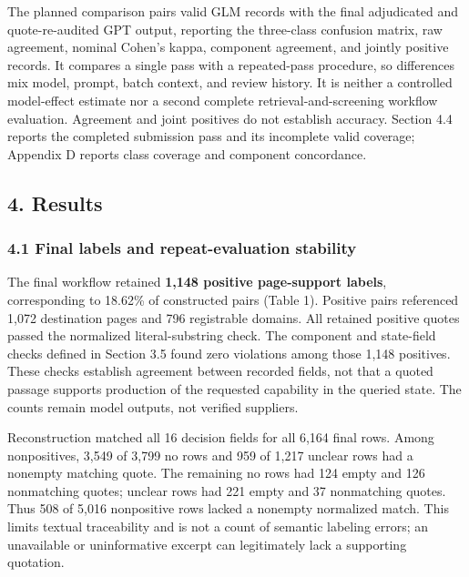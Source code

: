 \documentclass[10pt]{article}
\begin{document}
The planned comparison pairs valid GLM records with the final adjudicated and quote-re-audited GPT output, reporting the three-class confusion matrix, raw agreement, nominal Cohen's kappa, component agreement, and jointly positive records. It compares a single pass with a repeated-pass procedure, so differences mix model, prompt, batch context, and review history. It is neither a controlled model-effect estimate nor a second complete retrieval-and-screening workflow evaluation. Agreement and joint positives do not establish accuracy. Section 4.4 reports the completed submission pass and its incomplete valid coverage; Appendix D reports class coverage and component concordance.

\hypertarget{results}{%
\subsection{4. Results}\label{results}}

\hypertarget{final-labels-and-repeat-evaluation-stability}{%
\subsubsection{4.1 Final labels and repeat-evaluation stability}\label{final-labels-and-repeat-evaluation-stability}}

The final workflow retained \textbf{1,148 positive page-support labels}, corresponding to 18.62\% of constructed pairs (Table 1). Positive pairs referenced 1,072 destination pages and 796 registrable domains. All retained positive quotes passed the normalized literal-substring check. The component and state-field checks defined in Section 3.5 found zero violations among those 1,148 positives. These checks establish agreement between recorded fields, not that a quoted passage supports production of the requested capability in the queried state. The counts remain model outputs, not verified suppliers.

Reconstruction matched all 16 decision fields for all 6,164 final rows. Among nonpositives, 3,549 of 3,799 no rows and 959 of 1,217 unclear rows had a nonempty matching quote. The remaining no rows had 124 empty and 126 nonmatching quotes; unclear rows had 221 empty and 37 nonmatching quotes. Thus 508 of 5,016 nonpositive rows lacked a nonempty normalized match. This limits textual traceability and is not a count of semantic labeling errors; an unavailable or uninformative excerpt can legitimately lack a supporting quotation.
\end{document}
